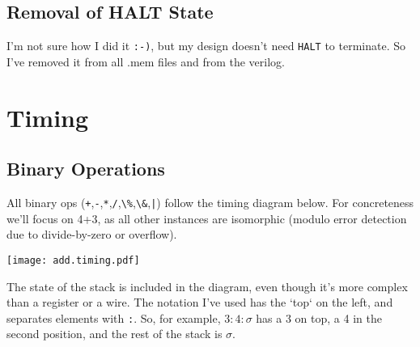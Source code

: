 \documentclass{article}
\begin{document}
%
%

\subsection{Removal of HALT State}

I'm not sure how I did it \verb':-)',
but my design doesn't need \verb'HALT' to terminate.
So I've removed it from all .mem files and from the
verilog.

\section{Timing}
\subsection{Binary Operations}

All binary ops (\verb'+',\verb'-',\verb'*',\verb'/',\verb'\%',\verb'\&',\verb'|') follow the timing diagram below.
For concreteness we'll focus on 4+3, as all other instances
are isomorphic (modulo error detection due to divide-by-zero or overflow).

\begin{center}
\texttt{[image: add.timing.pdf]}
\end{center}

The state of the stack is included in the diagram, even though it's more complex than a register or a wire.
The notation I've used has the `top` on the left, and separates elements with \verb':'.
So, for example, $3:4:\sigma$ has a 3 on top, a 4 in the second position, and the rest of the stack is $\sigma$.


%
%
\end{document}
